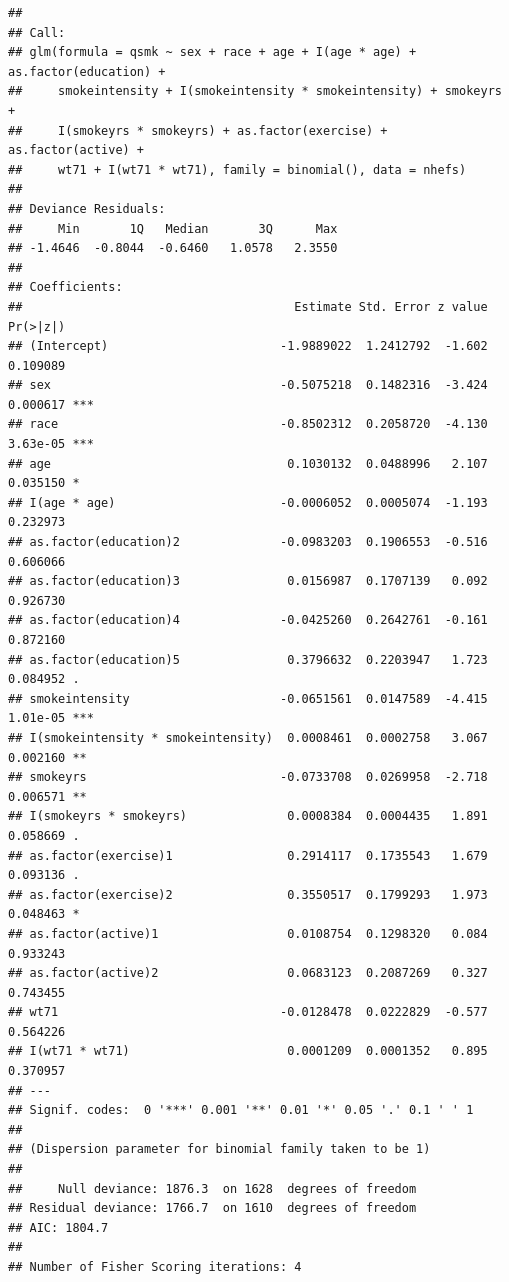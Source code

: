 \documentclass[
  10pt,
]{book}
\newenvironment{Shaded}{\begin{snugshade}}{\end{snugshade}}
\newcommand{\AttributeTok}[1]{\textcolor[rgb]{0.77,0.63,0.00}{#1}}
\newcommand{\DecValTok}[1]{\textcolor[rgb]{0.00,0.00,0.81}{#1}}
\newcommand{\FunctionTok}[1]{\textcolor[rgb]{0.00,0.00,0.00}{#1}}
\newcommand{\NormalTok}[1]{#1}
\newcommand{\OtherTok}[1]{\textcolor[rgb]{0.56,0.35,0.01}{#1}}
\newcommand{\SpecialCharTok}[1]{\textcolor[rgb]{0.00,0.00,0.00}{#1}}
\newcommand{\StringTok}[1]{\textcolor[rgb]{0.31,0.60,0.02}{#1}}
\begin{document}
\begin{verbatim}
## 
## Call:
## glm(formula = qsmk ~ sex + race + age + I(age * age) + as.factor(education) + 
##     smokeintensity + I(smokeintensity * smokeintensity) + smokeyrs + 
##     I(smokeyrs * smokeyrs) + as.factor(exercise) + as.factor(active) + 
##     wt71 + I(wt71 * wt71), family = binomial(), data = nhefs)
## 
## Deviance Residuals: 
##     Min       1Q   Median       3Q      Max  
## -1.4646  -0.8044  -0.6460   1.0578   2.3550  
## 
## Coefficients:
##                                      Estimate Std. Error z value Pr(>|z|)    
## (Intercept)                        -1.9889022  1.2412792  -1.602 0.109089    
## sex                                -0.5075218  0.1482316  -3.424 0.000617 ***
## race                               -0.8502312  0.2058720  -4.130 3.63e-05 ***
## age                                 0.1030132  0.0488996   2.107 0.035150 *  
## I(age * age)                       -0.0006052  0.0005074  -1.193 0.232973    
## as.factor(education)2              -0.0983203  0.1906553  -0.516 0.606066    
## as.factor(education)3               0.0156987  0.1707139   0.092 0.926730    
## as.factor(education)4              -0.0425260  0.2642761  -0.161 0.872160    
## as.factor(education)5               0.3796632  0.2203947   1.723 0.084952 .  
## smokeintensity                     -0.0651561  0.0147589  -4.415 1.01e-05 ***
## I(smokeintensity * smokeintensity)  0.0008461  0.0002758   3.067 0.002160 ** 
## smokeyrs                           -0.0733708  0.0269958  -2.718 0.006571 ** 
## I(smokeyrs * smokeyrs)              0.0008384  0.0004435   1.891 0.058669 .  
## as.factor(exercise)1                0.2914117  0.1735543   1.679 0.093136 .  
## as.factor(exercise)2                0.3550517  0.1799293   1.973 0.048463 *  
## as.factor(active)1                  0.0108754  0.1298320   0.084 0.933243    
## as.factor(active)2                  0.0683123  0.2087269   0.327 0.743455    
## wt71                               -0.0128478  0.0222829  -0.577 0.564226    
## I(wt71 * wt71)                      0.0001209  0.0001352   0.895 0.370957    
## ---
## Signif. codes:  0 '***' 0.001 '**' 0.01 '*' 0.05 '.' 0.1 ' ' 1
## 
## (Dispersion parameter for binomial family taken to be 1)
## 
##     Null deviance: 1876.3  on 1628  degrees of freedom
## Residual deviance: 1766.7  on 1610  degrees of freedom
## AIC: 1804.7
## 
## Number of Fisher Scoring iterations: 4
\end{verbatim}

\begin{Shaded}
\end{Shaded}
\end{document}
